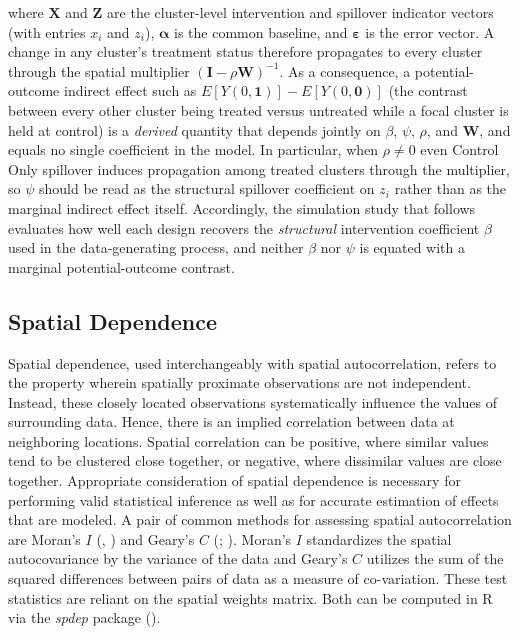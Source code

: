 \documentclass[
  12pt,
  prelim]{bios-prelim}
\begin{document}
where \(\mathbf{X}\) and \(\mathbf{Z}\) are the cluster-level
intervention and spillover indicator vectors (with entries \(x_i\) and
\(z_i\)), \(\boldsymbol\alpha\) is the common baseline, and
\(\boldsymbol\varepsilon\) is the error vector. A change in any
cluster's treatment status therefore propagates to every cluster through
the spatial multiplier \(\left(\mathbf{I} -
\rho\mathbf{W}\right)^{-1}\). As a consequence, a potential-outcome
indirect effect such as \(E[Y(0,\mathbf{1})] - E[Y(0,\mathbf{0})]\) (the
contrast between every other cluster being treated versus untreated
while a focal cluster is held at control) is a \emph{derived} quantity
that depends jointly on \(\beta\), \(\psi\), \(\rho\), and
\(\mathbf{W}\), and equals no single coefficient in the model. In
particular, when \(\rho \neq 0\) even Control Only spillover induces
propagation among treated clusters through the multiplier, so \(\psi\)
should be read as the structural spillover coefficient on \(z_i\) rather
than as the marginal indirect effect itself. Accordingly, the simulation
study that follows evaluates how well each design recovers the
\emph{structural} intervention coefficient \(\beta\) used in the
data-generating process, and neither \(\beta\) nor \(\psi\) is equated
with a marginal potential-outcome contrast.

\subsection{Spatial Dependence}\label{sec-spatial-weights-matrix}

Spatial dependence, used interchangeably with spatial autocorrelation,
refers to the property wherein spatially proximate observations are not
independent. Instead, these closely located observations systematically
influence the values of surrounding data. Hence, there is an implied
correlation between data at neighboring locations. Spatial correlation
can be positive, where similar values tend to be clustered close
together, or negative, where dissimilar values are close together.
Appropriate consideration of spatial dependence is necessary for
performing valid statistical inference as well as for accurate
estimation of effects that are modeled. A pair of common methods for
assessing spatial autocorrelation are Moran's \(\textit{I}\)
(,
) and Geary's \(\textit{C}\)
(;
). Moran's
\(\textit{I}\) standardizes the spatial autocovariance by the variance
of the data and Geary's \(\textit{C}\) utilizes the sum of the squared
differences between pairs of data as a measure of co-variation. These
test statistics are reliant on the spatial weights matrix. Both can be
computed in R via the \emph{spdep} package
().
\end{document}
